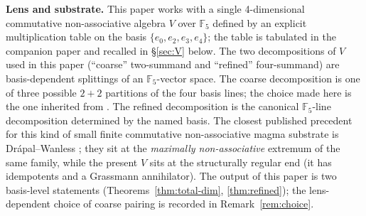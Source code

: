 \documentclass[11pt,reqno]{amsart}
\theoremstyle{plain}
\theoremstyle{definition}
\theoremstyle{remark}
\newcommand{\F}{\mathbb{F}}
\begin{document}
\noindent\textbf{Lens and substrate.}
This paper works with a single 4-dimensional commutative non-associative
algebra $V$ over $\F_5$ defined by an explicit multiplication table on
the basis $\{e_0, e_2, e_3, e_4\}$; the table is tabulated in the
companion paper \cite{SandersGishDiscreteDirac} and recalled in
\S\ref{sec:V} below.  The two decompositions of $V$ used in this paper
(``coarse'' two-summand and ``refined'' four-summand) are basis-dependent
splittings of an $\F_5$-vector space.  The coarse decomposition is one of
three possible $2{+}2$ partitions of the four basis lines; the choice
made here is the one inherited from \cite{SandersGishDiscreteDirac}.
The refined decomposition is the canonical $\F_5$-line decomposition
determined by the named basis.  The closest published precedent for
this kind of small finite commutative non-associative magma substrate
is Dr\'apal--Wanless \cite{DrapalWanless2021}; they sit at the
\emph{maximally non-associative} extremum of the same family, while the
present $V$ sits at the structurally regular end (it has idempotents and
a Grassmann annihilator).
The output of this paper is two basis-level statements
(Theorems~\ref{thm:total-dim}, \ref{thm:refined}); the lens-dependent
choice of coarse pairing is recorded in Remark~\ref{rem:choice}.
\end{document}
